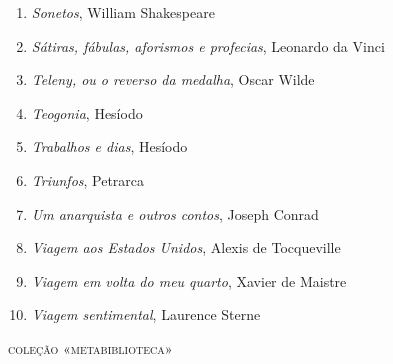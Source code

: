 \begin{enumerate}
\item \textit{Sonetos}, William Shakespeare
\item \textit{Sátiras, fábulas, aforismos e profecias}, Leonardo da Vinci
\item \textit{Teleny, ou o reverso da medalha}, Oscar Wilde
\item \textit{Teogonia}, Hesíodo
\item \textit{Trabalhos e dias}, Hesíodo
\item \textit{Triunfos}, Petrarca
\item \textit{Um anarquista e outros contos}, Joseph Conrad
\item \textit{Viagem aos Estados Unidos}, Alexis de Tocqueville
\item \textit{Viagem em volta do meu quarto}, Xavier de Maistre 
\item \textit{Viagem sentimental}, Laurence Sterne
\end{enumerate}


\medskip
{\large\textsc{coleção «metabiblioteca»}}



